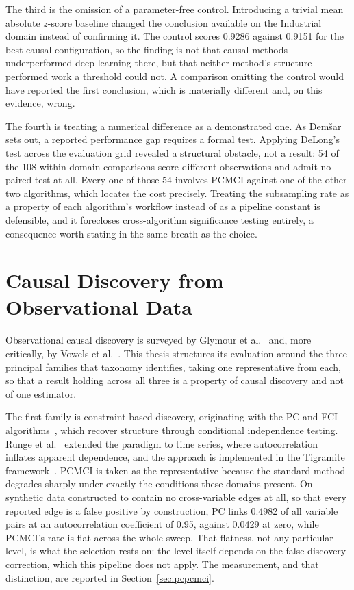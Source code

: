 The third is the omission of a parameter-free control. Introducing a trivial mean absolute $z$-score baseline changed the conclusion available on the Industrial domain instead of confirming it. The control scores 0.9286 against 0.9151 for the best causal configuration, so the finding is not that causal methods underperformed deep learning there, but that neither method's structure performed work a threshold could not. A comparison omitting the control would have reported the first conclusion, which is materially different and, on this evidence, wrong.

The fourth is treating a numerical difference as a demonstrated one. As Dem\v{s}ar~\cite{demsar2006statistical} sets out, a reported performance gap requires a formal test. Applying DeLong's test across the evaluation grid revealed a structural obstacle, not a result: 54 of the 108 within-domain comparisons score different observations and admit no paired test at all. Every one of those 54 involves PCMCI against one of the other two algorithms, which locates the cost precisely. Treating the subsampling rate as a property of each algorithm's workflow instead of as a pipeline constant is defensible, and it forecloses cross-algorithm significance testing entirely, a consequence worth stating in the same breath as the choice.

\section{Causal Discovery from Observational Data}
\label{sec:rw-cd}

Observational causal discovery is surveyed by Glymour et al.~\cite{glymour2019review} and, more critically, by Vowels et al.~\cite{vowels2022dags}. This thesis structures its evaluation around the three principal families that taxonomy identifies, taking one representative from each, so that a result holding across all three is a property of causal discovery and not of one estimator.

The first family is constraint-based discovery, originating with the PC and FCI algorithms~\cite{spirtes2000causation}, which recover structure through conditional independence testing. Runge et al.~\cite{runge2019pcmci,runge2020pcmciplus} extended the paradigm to time series, where autocorrelation inflates apparent dependence, and the approach is implemented in the Tigramite framework~\cite{runge2023tigramite}. PCMCI is taken as the representative because the standard method degrades sharply under exactly the conditions these domains present. On synthetic data constructed to contain no cross-variable edges at all, so that every reported edge is a false positive by construction, PC links 0.4982 of all variable pairs at an autocorrelation coefficient of 0.95, against 0.0429 at zero, while PCMCI's rate is flat across the whole sweep. That flatness, not any particular level, is what the selection rests on: the level itself depends on the false-discovery correction, which this pipeline does not apply. The measurement, and that distinction, are reported in Section~\ref{sec:pcpcmci}.

